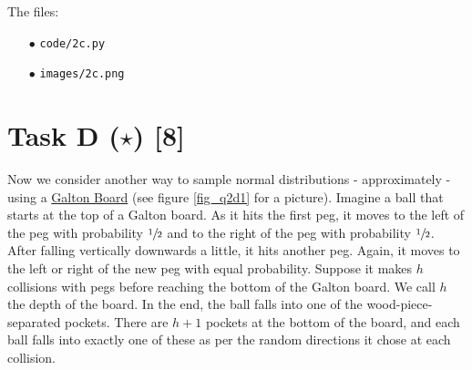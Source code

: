 \vspace{10pt}
\noindent The files:
\begin{itemize}
    \item[$\bullet$] \texttt{code/2c.py}
    \item[$\bullet$] \texttt{images/2c.png}
\end{itemize}

\section*{\colS{$\S$} Task D ($\star$) \hfill \normalfont \large [8]}

\begin{tcolorbox}
    Now we consider another way to sample normal distributions - approximately -
    using a \href{https://en.wikipedia.org/wiki/Galton_board}{Galton Board}
    (see figure \ref{fig_q2d1} for a picture). Imagine a ball that starts at the
    top of a Galton board. As it hits the first peg, it moves to the left of the
    peg with probability $\sfrac{1}{2}$ and to the right of the peg with
    probability $\sfrac{1}{2}$. After falling vertically downwards a little, it
    hits another peg. Again, it moves to the left or right of the new peg with
    equal probability.
    Suppose it makes $h$ collisions with pegs before reaching the bottom of the
    Galton board. We call $h$ the depth of the board. In the end, the ball falls
    into one of the wood-piece-separated pockets. There are $h + 1$ pockets at the
    bottom of the board, and each ball falls into exactly one of these as per the
    random directions it chose at each collision.


\end{tcolorbox}
